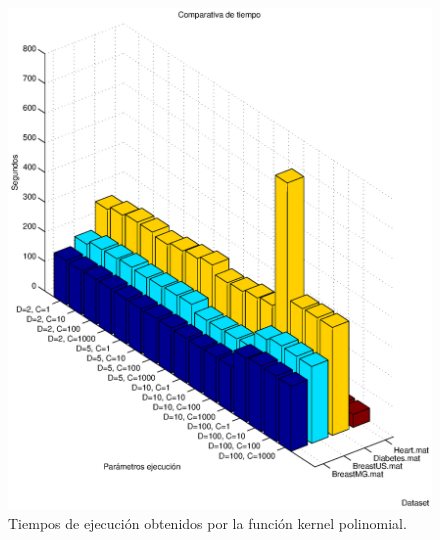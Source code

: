 \documentclass[spanish,12pt]{article}
\begin{document}
\begin{figure}
        \centering
        \includegraphics[width=\textwidth]{imagenes/polinomial-time}
        \caption{Tiempos de ejecución obtenidos por la función kernel polinomial.}\label{fig:polinomial-time}
\end{figure}

\end{document}
